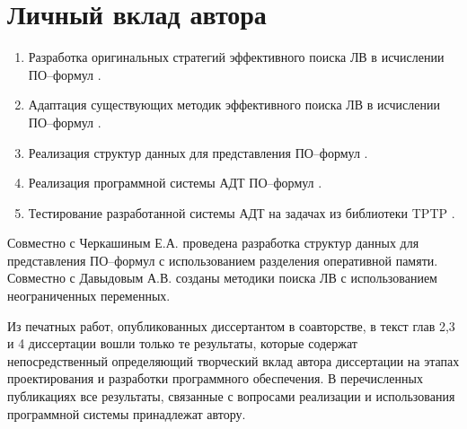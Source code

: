 \section*{Личный вклад автора}
\begin{enumerate}
\item Разработка оригинальных стратегий эффективного поиска ЛВ в исчислении ПО--формул \cite{mais, burvest, viner, QUANT4, mipro}.
\item Адаптация существующих методик эффективного поиска ЛВ в исчислении ПО--формул \cite{mais, distvirt, viner, mipro}.
\item Реализация структур данных для представления ПО--формул \cite{mais, viner, mipro, QUANT4}.
\item Реализация программной системы АДТ ПО--формул \cite{distvirt, burvest, viner, mipro, QUANT4}.
\item Тестирование разработанной системы АДТ на задачах из библиотеки TPTP \cite{distvirt, viner, mipro}.
\end{enumerate}

Совместно с Черкашиным Е.А. проведена разработка структур данных для представления ПО--формул с использованием разделения оперативной памяти. Совместно с Давыдовым А.В. созданы методики поиска ЛВ с использованием неограниченных переменных.

Из печатных работ, опубликованных диссертантом в соавторстве, в текст глав 2,3 и 4 диссертации вошли только те результаты, которые содержат непосредственный определяющий творческий вклад автора диссертации на этапах проектирования и разработки программного обеспечения. В перечисленных публикациях все результаты, связанные с вопросами реализации и использования программной системы принадлежат автору.






